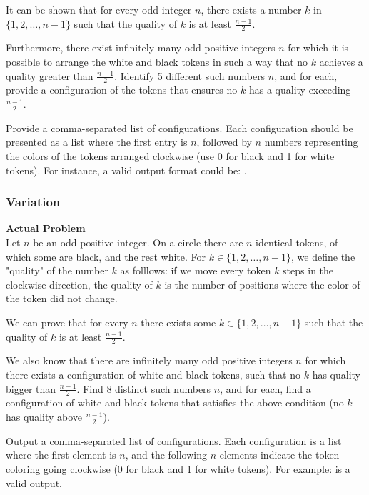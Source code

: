 It can be shown that for every odd integer \( n \), there exists a number \( k \) in \(\{1, 2, \ldots, n-1\}\) such that the quality of \( k \) is at least \(\frac{n-1}{2}\).

Furthermore, there exist infinitely many odd positive integers \( n \) for which it is possible to arrange the white and black tokens in such a way that no \( k \) achieves a quality greater than \(\frac{n-1}{2}\).
Identify 5 different such numbers \( n \), and for each, provide a configuration of the tokens that ensures no \( k \) has a quality exceeding \(\frac{n-1}{2}\).

Provide a comma-separated list of configurations. Each configuration should be presented as a list where the first entry is \( n \), followed by \( n \) numbers representing the colors of the tokens arranged clockwise (use 0 for black and 1 for white tokens). For instance, a valid output format could be: .

\subsubsection{Variation}
\textbf{Actual Problem}\\
Let $n$ be an odd positive integer. On a circle there are $n$ identical tokens, of which some are black, and the rest white. For $k \in \{1, 2, \ldots, n-1\}$, we define the "quality" of the number $k$ as folllows: if we move every token $k$ steps in the clockwise direction, the quality of $k$ is the number of positions where the color of the token did not change. 

We can prove that for every $n$ there exists some $k \in \{1, 2, \ldots, n-1\}$ such that the quality of $k$ is at least $\frac{n-1}{2}$.

We also know that there are infinitely many odd positive integers $n$ for which there exists a configuration of white and black tokens, such that no $k$ has quality bigger than $\frac{n-1}{2}$.
Find $8$ distinct such numbers $n$, and for each, find a configuration of white and black tokens that satisfies the above condition (no $k$ has quality above $\frac{n-1}{2}$).


Output a comma-separated list of configurations. Each configuration is a list where the first element is $n$, and the following $n$ elements indicate the token coloring going clockwise (0 for black and 1 for white tokens). For example:  is a valid output.

